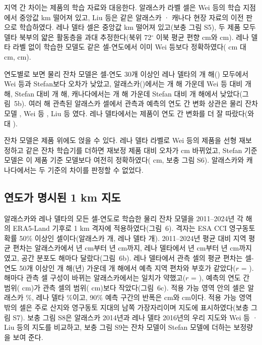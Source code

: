 지역 간 차이는 제품의 학습 자료와 대응한다. 알래스카 라벨 셀은 Wei 등의 학습 지점에서 중앙값 \ndistweiAkmed{} km 떨어져 있고, Liu 등은 같은 알래스카 · 캐나다 현장 자료의 이전 판으로 학습하였다. 레나 델타 셀은 중앙값 \ndistweiLemed{} km 떨어져 있고(보충 그림 S5), 두 제품 모두 델타 북부의 얇은 활동층을 과대 추정한다(북위 72$^\circ$ 이북 평균 편향 \nbiasLeNorthWei{} cm와 \nbiasLeNorthLiu{} cm). 레나 델타 라벨 없이 학습한 모델도 같은 셀-연도에서 이미 Wei 등보다 정확하였다(\ntlvprmseLeRsWeizero{} cm 대 \ntlvprmseLeWeizero{} cm, \ntlvpLeRsWeizero{} cm).

연도별로 보면 물리 잔차 모델은 셀-연도 30개 이상인 레나 델타의 \nywLen{}개 해(\nyrsywLeko) 모두에서 Wei 등과 Stefan보다 오차가 낮았고, 알래스카(\nyrsywAkko)에서는 \nywAkRoWein{}개 해 가운데 Wei 등 대비 \nywAkRoWeiwin{}개 해, Stefan 대비 \nywAkRoPowin{}개 해, 캐나다에서는 \nywCaRoPon{}개 해 가운데 Stefan 대비 \nywCaRoPowin{}개 해에서 낮았다(그림~5b). 여러 해 관측된 알래스카 셀에서 관측과 예측의 연도 간 변화 상관은 물리 잔차 모델 \nrdeltaAkRo, Wei 등 \nrdeltaAkWei, Liu 등 \nrdeltaAkLiu{}였다. 레나 델타에서는 제품이 연도 간 변화를 더 잘 따랐다(\nrdeltaLeWei{}와 \nrdeltaLeLiu{} 대 \nrdeltaLeRo).

잔차 모델은 제품 위에도 얹을 수 있다. 레나 델타 라벨로 Wei 등의 제품을 선형 재보정하고 같은 잔차 학습기를 더하면 재보정 제품 대비 오차가 \npadLeRpPcal{} cm 바뀌었고, Stefan 기준 모델은 이 제품 기준 모델보다 여전히 정확하였다(\npadLeRoRp{} cm, 보충 그림 S6). 알래스카와 캐나다에서는 두 기준의 차이를 판정할 수 없었다.

\subsection{연도가 명시된 1 km 지도}
알래스카와 레나 델타의 모든 셀-연도로 학습한 물리 잔차 모델을 2011--2024년 각 해의 ERA5-Land 기후로 1 km 격자에 적용하였다(그림~6). 격자는 ESA CCI 영구동토 확률 50\% 이상인 셀이다(알래스카 \nncellmapAk{}개, 레나 델타 \nncellmapLe{}개). 2011--2024년 평균 대비 지역 평균 편차는 알래스카에서 \nanminyrAk{}년 \nanminAk{} cm부터 \nanmaxyrAk{}년 \nanmaxAk{} cm까지, 레나 델타에서 \nanminyrLe{}년 \nanminLe{} cm부터 \nanmaxyrLe{}년 \nanmaxLe{} cm까지였고, 공간 분포도 해마다 달랐다(그림~6b). 레나 델타에서 관측 셀의 평균 편차는 셀-연도 50개 이상인 \nanobsnLe{}개 해(\nanobsyrsLe{}년) 가운데 \nanobssameLe{}개 해에서 예측 지역 편차와 부호가 같았다($r$ = \nanobsrLe). 해마다 관측 셀 구성이 바뀌는 알래스카에서는 일치가 약했고($r$ = \nanobsrAk), 예측의 연도 간 범위(\nanpredrangeAk{} cm)가 관측 셀의 범위(\nanobsrangeAk{} cm)보다 작았다(그림~6c). 적용 가능 영역 안의 셀은 알래스카 \naoaAk\%, 레나 델타 \naoaLe\%이고, 90\% 예측 구간의 반폭은 \nhwAk{} cm와 \nhwLe{} cm이다. 적용 가능 영역 밖의 셀은 주로 산지와 영구동토 지대의 남쪽 가장자리이며 지도에 표시하였다(보충 그림 S7). 보충 그림 S8은 알래스카 2014년과 레나 델타 2016년의 우리 지도와 Wei 등 · Liu 등의 지도를 비교하고, 보충 그림 S9는 잔차 모델이 Stefan 모델에 더하는 보정량을 보여 준다.
